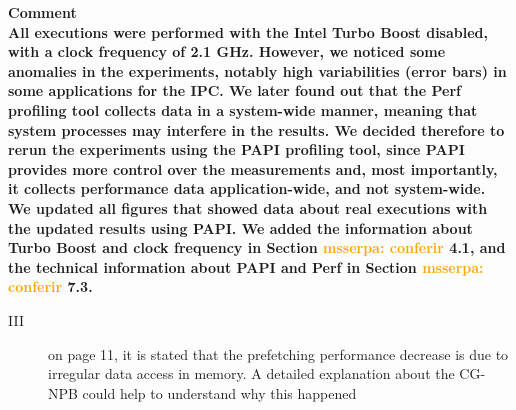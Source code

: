 \documentclass{article}
\newcounter{answer}
\newenvironment{answer}
{ \refstepcounter{answer}\vspace{0.5cm}\bfseries\noindent Comment~\theanswer\\ }
{ \vspace{0.5cm} }
\newcommand{\ms}[1]{\textcolor{orange}{\textbf{ msserpa: #1} }\vspace{0.2cm}}
\newcommand{\dcs}[1]{\textcolor{ForestGreen}{\textbf{dcsantos: #1} }\vspace{0.2cm}}
\begin{document}
\begin{answer}

All executions were performed with the Intel Turbo Boost disabled, with a clock frequency of 2.1 GHz. However, we noticed some anomalies in the experiments, notably high variabilities (error bars) in some applications for the IPC. We later found out that the Perf profiling tool collects data in a system-wide manner, meaning that system processes may interfere in the results. We decided therefore to rerun the experiments using the PAPI profiling tool, since PAPI provides more control over the measurements and, most importantly, it collects performance data application-wide, and not system-wide. We updated all figures that showed data about real executions with the updated results using PAPI. We added the information about Turbo Boost and clock frequency in Section \ms{conferir}4.1, and the technical information about PAPI and Perf in Section \ms{conferir}7.3.






\end{answer}

\begin{description}
    \item[III] on page 11, it is stated that the prefetching performance decrease is due to irregular data access in memory. A detailed explanation about the CG-NPB could help to understand why this happened
\end{description}
\end{document}
